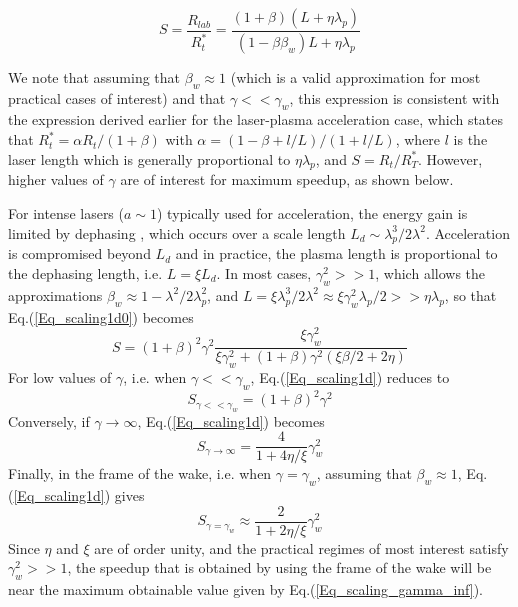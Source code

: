\documentclass[]{report}
\begin{document}
\begin{equation}
S=\frac{R_{lab}}{R_t^*}=\frac{\left(1+\beta\right)\left(L+\eta \lambda_p\right)}{\left(1-\beta\beta_w\right)L+\eta \lambda_p}
\label{Eq_scaling1d0}
\end{equation}

We note that assuming that $\beta_w\approx1$ (which is a valid approximation for most practical cases of interest) and that $\gamma<<\gamma_w$, this expression is consistent with the expression derived earlier \cite{Vayprl07} for the laser-plasma acceleration case, which states that $R_t^*=\alpha R_t/\left(1+\beta\right)$ with $\alpha=\left(1-\beta+l/L\right)/\left(1+l/L\right)$, where $l$ is the laser length which is generally proportional to $\eta \lambda_p$, and $S=R_t/R_T^*$. However, higher values of $\gamma$ are of interest for maximum speedup, as shown below.

For intense lasers ($a\sim 1$) typically used for acceleration, the energy gain is limited by dephasing \cite{Schroederprl2011}, which occurs over a scale length $L_d \sim \lambda_p^3/2\lambda^2$.
Acceleration is compromised beyond $L_d$ and in practice, the plasma length is proportional to the dephasing length, i.e. $L= \xi L_d$. In most cases, $\gamma_w^2>>1$, which allows the approximations $\beta_w\approx1-\lambda^2/2\lambda_p^2$, and $L=\xi \lambda_p^3/2\lambda^2\approx \xi \gamma_w^2 \lambda_p/2>>\eta \lambda_p$, so that Eq.(\ref{Eq_scaling1d0}) becomes
%
\begin{equation}
S=\left(1+\beta\right)^2\gamma^2\frac{\xi\gamma_w^2}{\xi\gamma_w^2+\left(1+\beta\right)\gamma^2\left(\xi\beta/2+2\eta\right)}
\label{Eq_scaling1d}
\end{equation}
%
For low values of $\gamma$, i.e. when $\gamma<<\gamma_w$, Eq.(\ref{Eq_scaling1d}) reduces to
%
\begin{equation}
S_{\gamma<<\gamma_w}=\left(1+\beta\right)^2\gamma^2
\label{Eq_scaling1d_simpl2}
\end{equation}
%
Conversely, if $\gamma\rightarrow\infty$, Eq.(\ref{Eq_scaling1d}) becomes
%
\begin{equation}
S_{\gamma\rightarrow\infty}=\frac{4}{1+4\eta/\xi}\gamma_w^2
\label{Eq_scaling_gamma_inf}
\end{equation}
%
Finally, in the frame of the wake, i.e. when $\gamma=\gamma_w$, assuming that $\beta_w\approx1$, Eq.(\ref{Eq_scaling1d}) gives
%
\begin{equation}
S_{\gamma=\gamma_w}\approx\frac{2}{1+2\eta/\xi}\gamma_w^2
\label{Eq_scaling_gamma_wake}
\end{equation}
Since $\eta$ and $\xi$ are of order unity, and the practical regimes of most interest satisfy $\gamma_w^2>>1$, the speedup that is obtained by using the frame of the wake will be near the maximum obtainable value given by Eq.(\ref{Eq_scaling_gamma_inf}).
\end{document}
